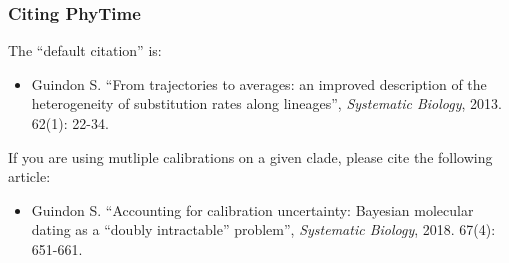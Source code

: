 \documentclass[a4paper,12pt]{article}
\begin{document}





\subsubsection{Citing PhyTime}\label{sec:citephytime}

The ``default citation'' is:

\begin{itemize}
\item Guindon S. ``From trajectories to averages: an improved description of the heterogeneity of
substitution rates along lineages'', {\it Systematic Biology}, 2013. 62(1): 22-34.
\end{itemize}

If you are using mutliple calibrations on a given clade, please cite the following article:
\begin{itemize}
\item Guindon S. ``Accounting for calibration uncertainty: Bayesian molecular dating as a ``doubly intractable'' problem'', {\it Systematic Biology}, 2018. 67(4): 651-661.
\end{itemize}
\end{document}
